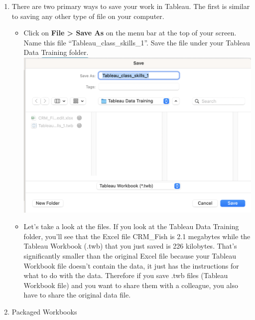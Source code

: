 \documentclass[
]{book}
\providecommand{\tightlist}{%
  \setlength{\itemsep}{0pt}\setlength{\parskip}{0pt}}
\begin{document}
\begin{enumerate}
\def\labelenumi{\arabic{enumi}.}
\tightlist
\item
  There are two primary ways to save your work in Tableau. The first is similar to saving any other type of file on your computer.

  \begin{itemize}
  \tightlist
  \item
    Click on \textbf{File \textgreater{} Save As} on the menu bar at the top of your screen. Name this file ``Tableau\_class\_skills\_1''. Save the file under your Tableau Data Training folder.
    \includegraphics{images/M3S2_save-as.png}
  \item
    Let's take a look at the files. If you look at the Tableau Data Training folder, you'll see that the Excel file CRM\_Fish is 2.1 megabytes while the Tableau Workbook (.twb) that you just saved is 226 kilobytes. That's significantly smaller than the original Excel file because your Tableau Workbook file doesn't contain the data, it just has the instructions for what to do with the data. Therefore if you save .twb files (Tableau Workbook file) and you want to share them with a colleague, you also have to share the original data file.
  \end{itemize}
\item
  Packaged Workbooks


\end{enumerate}
\end{document}
